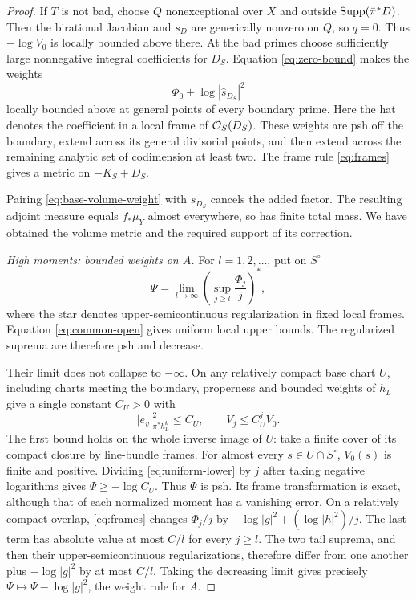 \begin{proof}
If \(T\) is not bad, choose \(Q\) nonexceptional over \(X\) and
outside \(\operatorname{Supp}(\bar\pi^*D)\). Then the birational Jacobian and \(s_D\)
are generically nonzero on \(Q\), so \(q=0\). Thus \(-\log V_0\)
is locally bounded above there. At the bad primes choose sufficiently
large nonnegative integral coefficients for \(D_S\). Equation
\eqref{eq:zero-bound} makes the weights
\begin{equation}\label{eq:base-volume-weight}
 \Phi_0+\log|\widehat s_{D_S}|^2
\end{equation}
locally bounded above at general points of every boundary prime.
Here the hat denotes the coefficient in a local frame of \(\mathcal O_S(D_S)\).
These weights are psh off the boundary, extend across its general
divisorial points, and then extend across the remaining analytic set
of codimension at least two. The frame rule \eqref{eq:frames} gives a
metric on \(-K_S+D_S\).

Pairing \eqref{eq:base-volume-weight} with \(s_{D_S}\) cancels the
added factor. The resulting adjoint measure equals \(f_*\mu_Y\)
almost everywhere, so has finite total mass. We have obtained the
volume metric and the required support of its correction.

\medskip\noindent
\emph{High moments: bounded weights on \(A\).}
For \(l=1,2,\ldots\), put on \(S^\circ\)
\begin{equation}\label{eq:envelope}
 \Psi=\lim_{l\to\infty}
      \left(\sup_{j\ge l}\frac{\Phi_j}{j}\right)^* ,
\end{equation}
where the star denotes upper-semicontinuous regularization in fixed
local frames. Equation \eqref{eq:common-open} gives uniform local
upper bounds. The regularized suprema are therefore psh and decrease.

Their limit does not collapse to \(-\infty\).
On any relatively compact base chart \(U\), including charts meeting
the boundary, properness and bounded weights of \(h_L\) give a single
constant \(C_U>0\) with
\begin{equation}\label{eq:uniform-lower}
 |e_v|_{\pi^*h_L^k}^2\le C_U,\qquad V_j\le C_U^jV_0 .
\end{equation}
The first bound holds on the whole inverse image of \(U\):
take a finite cover of its compact closure by line-bundle frames.
For almost every \(s\in U\cap S^\circ\), \(V_0(s)\) is finite and
positive. Dividing \eqref{eq:uniform-lower} by \(j\) after taking
negative logarithms gives
\(\Psi\ge-\log C_U\).
Thus \(\Psi\) is psh. Its frame transformation is exact, although
that of each normalized moment has a vanishing error. On a relatively
compact overlap, \eqref{eq:frames} changes \(\Phi_j/j\) by
\(-\log|g|^2+(\log|h|^2)/j\). The last term has absolute value
at most \(C/l\) for every \(j\ge l\). The two tail suprema,
and then their upper-semicontinuous regularizations, therefore differ
from one another plus \(-\log|g|^2\) by at most \(C/l\).
Taking the decreasing limit gives precisely
\(\Psi\mapsto\Psi-\log|g|^2\), the weight rule for \(A\).


\end{proof}
